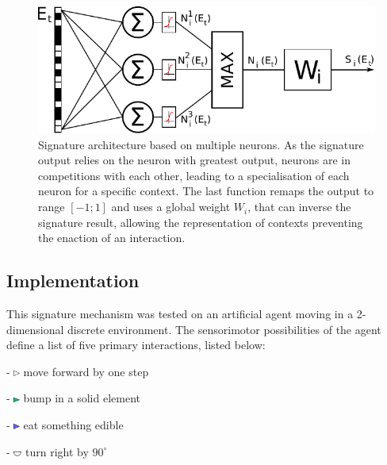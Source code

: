 \documentclass[conference]{IEEEtran}
\begin{document}
\begin{figure}[htbp]
\centerline{\includegraphics[scale=0.7]{img/signature_model2.pdf}}
\caption{Signature architecture based on multiple neurons. As the signature output relies on the neuron with greatest output, neurons are in competitions with each other, leading to a specialisation of each neuron for a specific context. The last function remaps the output to range $[-1;1]$ and uses a global weight $W_i$, that can inverse the signature result, allowing the representation of contexts preventing the enaction of an interaction.}
\label{fig}
\end{figure}

\subsection{Implementation}

This signature mechanism was tested on an artificial agent moving in a 2-dimensional discrete environment. The sensorimotor possibilities of the agent define a list of five primary interactions, listed below:

- \includegraphics[width=0.015\textwidth]{img/mf0.pdf} move forward by one step

- \includegraphics[width=0.015\textwidth]{img/mf1.pdf} bump in a solid element 

- \includegraphics[width=0.015\textwidth]{img/mf2.pdf} eat something edible 

- \includegraphics[width=0.02\textwidth]{img/rt0.pdf} turn right by $90^\circ$ 
\end{document}
